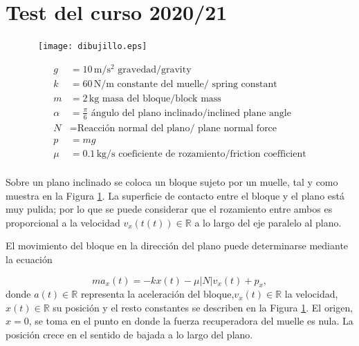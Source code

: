 \section{Test del curso 2020/21}
\begin{figure}[h]
\begin{minipage}{0.5\textwidth} \ 
\texttt{[image: dibujillo.eps]}
\end{minipage}
\begin{minipage}{0.5\textwidth}
\begin{align*}
g &= 10 \, \text{m}/\text{s}^2 \text{\ gravedad/gravity}\\
k &= 60 \, \text{N}/\text{m} \text{\ constante del muelle/ spring constant}\\
m &= 2 \, \text{kg} \text{\ masa del bloque/block mass}\\
\alpha &= \frac{\pi}{6} \text{\ ángulo del plano inclinado/inclined plane angle}\\
N &= \text{Reacción normal del plano/ plane normal force}\\
p &= mg\\
	\mu &= 0.1 \, \text{kg}/\text{s} \text{\ coeficiente de rozamiento/friction coefficient}\\
\end{align*}

\end{minipage}
\label{fig1}
\end{figure}

Sobre un plano inclinado se coloca un bloque sujeto por un muelle, tal y como muestra en la Figura \ref{fig1}. La superficie de contacto entre el bloque y el plano está muy pulida; por lo que se puede considerar que el rozamiento entre ambos es proporcional a la velocidad $v_x(t(t))\in\mathbb{R}$ a lo largo del eje paralelo al plano.

El movimiento del bloque en la dirección del plano puede determinarse mediante la ecuación

\begin{equation}
	ma_{x}(t) = -kx(t) -\mu \lvert N \lvert v_x(t) + p_x, \label{eq: f}
\end{equation}
donde $a(t)\in\mathbb{R}$ representa la aceleración del bloque,$v_x(t) \in\mathbb{R}$ la velocidad, $x(t)\in\mathbb{R}$ su posición y el resto constantes se describen en la Figura \ref{fig1}. El origen, $x=0$, se toma en el punto en donde la fuerza recuperadora del muelle es nula. La posición crece en el sentido de bajada a lo largo del plano.

